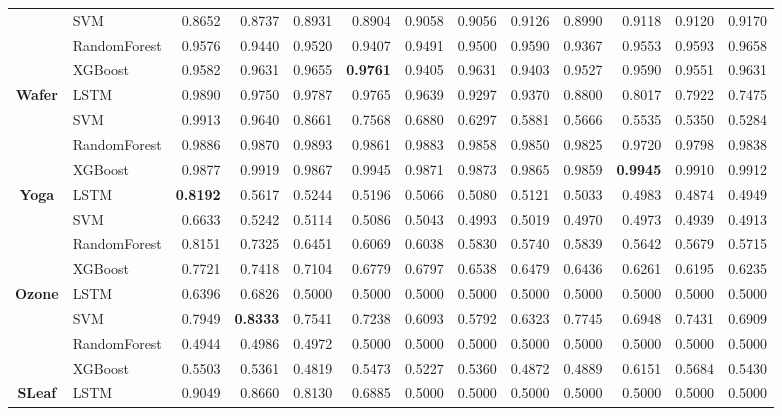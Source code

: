 \begin{table}[h]
\begin{adjustbox}{max width=15cm}
\begin{tabular}{|c|l|r|r|r|r|r|r|r|r|r|r|r|}
		& SVM &  0.8652 &  0.8737 &  0.8931 &  0.8904 &  0.9058 &  0.9056 &  0.9126 &  0.8990 &  0.9118 &  0.9120 &  0.9170 \\
		& RandomForest &  0.9576 &  0.9440 &  0.9520 &  0.9407 &  0.9491 &  0.9500 &  0.9590 &  0.9367 &  0.9553 &  0.9593 &  0.9658 \\
		& XGBoost &  0.9582 &  0.9631 &  0.9655 &  \textbf{0.9761} &  0.9405 &  0.9631 &  0.9403 &  0.9527 &  0.9590 &  0.9551 &  0.9631 \\
		\hline
		\textbf{Wafer} & LSTM &  0.9890 &  0.9750 &  0.9787 &  0.9765 &  0.9639 &  0.9297 &  0.9370 &  0.8800 &  0.8017 &  0.7922 &  0.7475 \\
		& SVM &  0.9913 &  0.9640 &  0.8661 &  0.7568 &  0.6880 &  0.6297 &  0.5881 &  0.5666 &  0.5535 &  0.5350 &  0.5284 \\
		& RandomForest &  0.9886 &  0.9870 &  0.9893 &  0.9861 &  0.9883 &  0.9858 &  0.9850 &  0.9825 &  0.9720 &  0.9798 &  0.9838 \\
		& XGBoost &  0.9877 &  0.9919 &  0.9867 &  0.9945 &  0.9871 &  0.9873 &  0.9865 &  0.9859 &  \textbf{0.9945} &  0.9910 &  0.9912 \\
		\hline
		\textbf{Yoga} & LSTM &  \textbf{0.8192} &  0.5617 &  0.5244 &  0.5196 &  0.5066 &  0.5080 &  0.5121 &  0.5033 &  0.4983 &  0.4874 &  0.4949 \\
		& SVM &  0.6633 &  0.5242 &  0.5114 &  0.5086 &  0.5043 &  0.4993 &  0.5019 &  0.4970 &  0.4973 &  0.4939 &  0.4913 \\
		& RandomForest &  0.8151 &  0.7325 &  0.6451 &  0.6069 &  0.6038 &  0.5830 &  0.5740 &  0.5839 &  0.5642 &  0.5679 &  0.5715 \\
		& XGBoost &  0.7721 &  0.7418 &  0.7104 &  0.6779 &  0.6797 &  0.6538 &  0.6479 &  0.6436 &  0.6261 &  0.6195 &  0.6235 \\
		\hline
		\textbf{Ozone} & LSTM &  0.6396 &  0.6826 &  0.5000 &  0.5000 &  0.5000 &  0.5000 &  0.5000 &  0.5000 &  0.5000 &  0.5000 &  0.5000 \\
		& SVM &  0.7949 &  \textbf{0.8333} &  0.7541 &  0.7238 &  0.6093 &  0.5792 &  0.6323 &  0.7745 &  0.6948 &  0.7431 &  0.6909 \\
		& RandomForest &  0.4944 &  0.4986 &  0.4972 &  0.5000 &  0.5000 &  0.5000 &  0.5000 &  0.5000 &  0.5000 &  0.5000 &  0.5000 \\
		& XGBoost &  0.5503 &  0.5361 &  0.4819 &  0.5473 &  0.5227 &  0.5360 &  0.4872 &  0.4889 &  0.6151 &  0.5684 &  0.5430 \\
		\hline
		\textbf{SLeaf} & LSTM &  0.9049 &  0.8660 &  0.8130 &  0.6885 &  0.5000 &  0.5000 &  0.5000 &  0.5000 &  0.5000 &  0.5000 &  0.5000 \\

\end{tabular}
\end{adjustbox}
\end{table}
